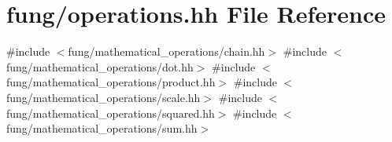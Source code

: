 \hypertarget{operations_8hh}{\section{fung/operations.hh \-File \-Reference}
\label{operations_8hh}
}
{\ttfamily \#include $<$fung/mathematical\-\_\-operations/chain.\-hh$>$}\*
{\ttfamily \#include $<$fung/mathematical\-\_\-operations/dot.\-hh$>$}\*
{\ttfamily \#include $<$fung/mathematical\-\_\-operations/product.\-hh$>$}\*
{\ttfamily \#include $<$fung/mathematical\-\_\-operations/scale.\-hh$>$}\*
{\ttfamily \#include $<$fung/mathematical\-\_\-operations/squared.\-hh$>$}\*
{\ttfamily \#include $<$fung/mathematical\-\_\-operations/sum.\-hh$>$}\*

